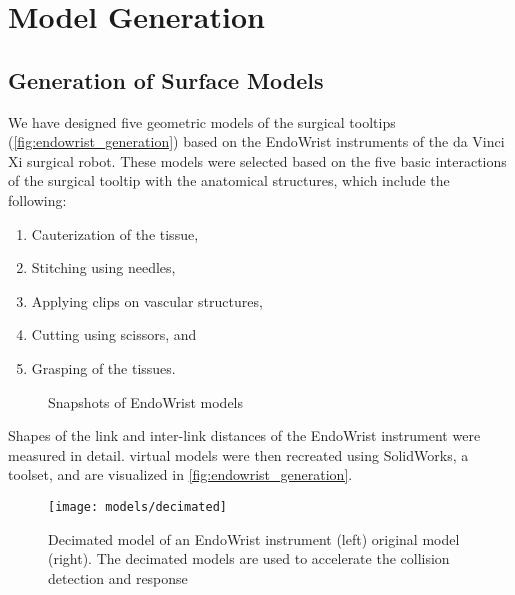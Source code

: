 
\section{Model Generation}\label{sec:generation_3d}

\subsection{Generation of Surface Models}\label{ssec:generation_surface}

We have designed five geometric models of the surgical tooltips (\autoref{fig:endowrist_generation}) based on the EndoWrist instruments of the da Vinci Xi surgical robot. These models were selected based on the five basic interactions of the surgical tooltip with the anatomical structures, which include the following:
\begin{enumerate}
  \item Cauterization of the tissue,
  \item Stitching using needles,
  \item Applying clips on vascular structures,
  \item Cutting using scissors, and
  \item Grasping of the tissues.
\end{enumerate}

\begin{figure}
  \centering%
  \caption{Snapshots of EndoWrist   models}\label{fig:endowrist_generation}
\end{figure}

Shapes of the link and inter-link distances of the EndoWrist instrument were measured in detail.  virtual models were then recreated using SolidWorks, a  toolset, and are visualized in \autoref{fig:endowrist_generation}.

\begin{figure}
  \centering%
  \texttt{[image: models/decimated]}
  \caption{Decimated model of an EndoWrist instrument (left) \vs original model (right). The decimated models are used to accelerate the collision detection and response}\label{fig:decimated}
\end{figure}


